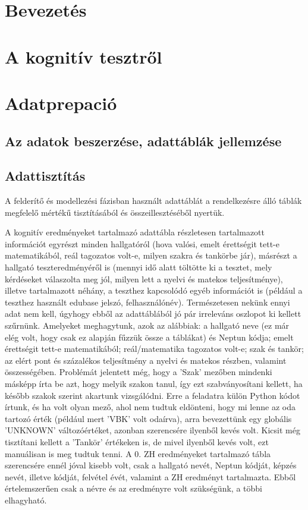 \documentclass[12pt]{article}
\begin{document}
\tableofcontents


\section{Bevezetés}

\section{A kognitív tesztről}

\section{Adatprepació}

\subsection{Az adatok beszerzése, adattáblák jellemzése}



\subsection{Adattisztítás}

A felderítő és modellezési fázisban használt adattáblát a rendelkezésre álló táblák megfelelő mértékű tisztításából és összeillesztéséből nyertük.

A kognitív eredményeket tartalmazó adattábla részletesen tartalmazott információt egyrészt minden hallgatóról (hova valósi, emelt érettségit tett-e matematikából, reál tagozatos volt-e, milyen szakra és tankörbe jár), másrészt a hallgató teszteredményéről is (mennyi idő alatt töltötte ki a tesztet, mely kérdéseket válaszolta meg jól, milyen lett a nyelvi és matekos teljesítménye), illetve tartalmazott néhány, a teszthez kapcsolódó egyéb információt is (például a teszthez használt edubase jelszó, felhasználónév). Természetesen nekünk ennyi adat nem kell, úgyhogy ebből az adattáblából jó pár irreleváns oszlopot ki kellett szűrnünk. Amelyeket meghagytunk, azok az alábbiak: a hallgató neve (ez már elég volt, hogy csak ez alapján fűzzük össze a táblákat) és Neptun kódja; emelt érettségit tett-e matematikából; reál/matematika tagozatos volt-e; szak és tankör; az elért pont és százalékos teljesítmény a nyelvi és matekos részben, valamint összességében. Problémát jelentett még, hogy a ’Szak’ mezőben mindenki másképp írta be azt, hogy melyik szakon tanul, így ezt szabványosítani kellett, ha később szakok szerint akartunk vizsgálódni. Erre a feladatra külön Python kódot írtunk, és ha volt olyan mező, ahol nem tudtuk eldönteni, hogy mi lenne az oda tartozó érték (például mert ’VBK’ volt odaírva), arra bevezettünk egy globális ’UNKNOWN’ változóértéket, azonban szerencsére ilyenből kevés volt. Kicsit még tisztítani kellett a ’Tankör’ értékeken is, de mivel ilyenből kevés volt, ezt manuálisan is meg tudtuk tenni.
A 0. ZH eredményeket tartalmazó tábla szerencsére ennél jóval kisebb volt, csak a hallgató nevét, Neptun kódját, képzés nevét, illetve kódját, felvétel évét, valamint a ZH eredményt tartalmazta. Ebből értelemszerűen csak a névre és az eredményre volt szükségünk, a többi elhagyható.
\end{document}
